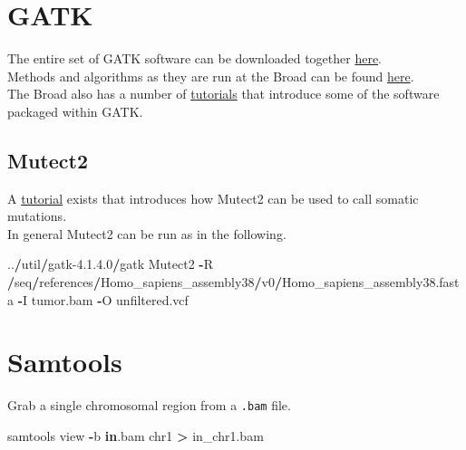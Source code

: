 \documentclass[]{book}
\newenvironment{Shaded}{\begin{snugshade}}{\end{snugshade}}
\newcommand{\DecValTok}[1]{\textcolor[rgb]{0.00,0.00,0.81}{#1}}
\newcommand{\FloatTok}[1]{\textcolor[rgb]{0.00,0.00,0.81}{#1}}
\newcommand{\KeywordTok}[1]{\textcolor[rgb]{0.13,0.29,0.53}{\textbf{#1}}}
\newcommand{\NormalTok}[1]{#1}
\newcommand{\OperatorTok}[1]{\textcolor[rgb]{0.81,0.36,0.00}{\textbf{#1}}}
\begin{document}
\hypertarget{gatk}{%
\section{GATK}\label{gatk}}

The entire set of GATK software can be downloaded together \href{'https://software.broadinstitute.org/gatk/'}{here}.\\
Methods and algorithms as they are run at the Broad can be found \href{'https://software.broadinstitute.org/gatk/documentation/topic?name=methods'}{here}.\\
The Broad also has a number of \href{'https://software.broadinstitute.org/gatk/documentation/topic?name=tutorials'}{tutorials} that introduce some of the software packaged within GATK.

\hypertarget{mutect2}{%
\subsection{Mutect2}\label{mutect2}}

A \href{'https://software.broadinstitute.org/gatk/documentation/article?id=24057'}{tutorial} exists that introduces how Mutect2 can be used to call somatic mutations.\\
In general Mutect2 can be run as in the following.

\begin{Shaded}
\begin{Highlighting}[]
\NormalTok{..}\OperatorTok{/}\NormalTok{util}\OperatorTok{/}\NormalTok{gatk}\DecValTok{-4}\NormalTok{.}\DecValTok{1}\NormalTok{.}\FloatTok{4.0}\OperatorTok{/}\NormalTok{gatk Mutect2 }\OperatorTok{-}\NormalTok{R }\OperatorTok{/}\NormalTok{seq}\OperatorTok{/}\NormalTok{references}\OperatorTok{/}\NormalTok{Homo_sapiens_assembly38}\OperatorTok{/}\NormalTok{v0}\OperatorTok{/}\NormalTok{Homo_sapiens_assembly38.fasta }\OperatorTok{-}\NormalTok{I tumor.bam }\OperatorTok{-}\NormalTok{O unfiltered.vcf}
\end{Highlighting}
\end{Shaded}

\hypertarget{samtools}{%
\section{Samtools}\label{samtools}}

Grab a single chromosomal region from a \texttt{.bam} file.

\begin{Shaded}
\begin{Highlighting}[]
\NormalTok{samtools view }\OperatorTok{-}\NormalTok{b }\KeywordTok{in}\NormalTok{.bam chr1 }\OperatorTok{>}\NormalTok{ in_chr1.bam          }
\end{Highlighting}
\end{Shaded}
\end{document}
